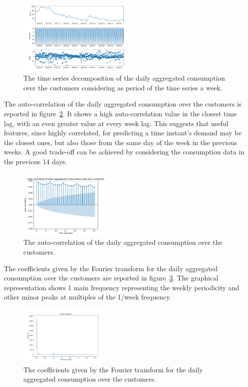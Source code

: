 \begin{figure}[H]
\centering
\includegraphics[width=0.5\textwidth]{images/demand/daily_aggregated_decomposition}
\caption{The time series decomposition of the daily aggregated consumption over the customers considering as period of the time series a week.}
\label{fig:demanddecompositionday}
\end{figure}

The auto-correlation of the daily aggregated consumption over the customers is reported in figure~\ref{fig:demandcorrelationday}.
It shows a high auto-correlation value in the closest time lag, with an even greater value at every week lag.
This suggests that useful features, since highly correlated, for predicting a time instant's demand may be the closest ones, but also those from the same day of the week in the previous weeks.
A good trade-off can be achieved by considering the consumption data in the previous 14 days.

\begin{figure}[H]
\centering
\includegraphics[width=0.4\textwidth]{images/demand/daily_aggregated_correlation}
\caption{The auto-correlation of the daily aggregated consumption over the customers.}
\label{fig:demandcorrelationday}
\end{figure}

The coefficients given by the Fourier transform for the daily aggregated consumption over the customers are reported in figure~\ref{fig:demandftday}.
The graphical representation shows 1 main frequency representing the weekly periodicity and other minor peaks at multiples of the 1/week frequency.

\begin{figure}[H]
\centering
\includegraphics[width=0.4\textwidth]{images/demand/ft_day}
\caption{The coefficients given by the Fourier transform for the daily aggregated consumption over the customers.}
\label{fig:demandftday}
\end{figure}


